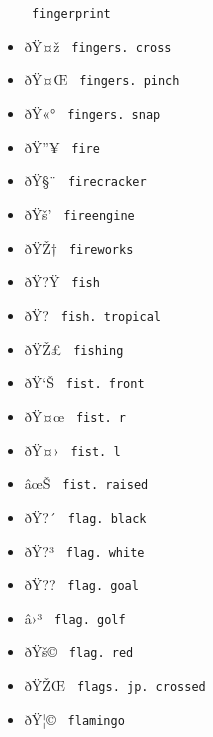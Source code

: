 \begin{itemize}
{  \texttt{\ fingerprint\ }}
\item
  \label{symbol-fingers.cross}{{ ðŸ¤ž }
  \texttt{\ fingers.\ cross\ }}
\item
  \label{symbol-fingers.pinch}{{ ðŸ¤Œ }
  \texttt{\ fingers.\ pinch\ }}
\item
  \label{symbol-fingers.snap}{{ ðŸ«° }
  \texttt{\ fingers.\ snap\ }}
\item
  \label{symbol-fire}{{ ðŸ''¥ } \texttt{\ fire\ }}
\item
  \label{symbol-firecracker}{{ ðŸ§¨ }
  \texttt{\ firecracker\ }}
\item
  \label{symbol-fireengine}{{ ðŸš' }
  \texttt{\ fireengine\ }}
\item
  \label{symbol-fireworks}{{ ðŸŽ† }
  \texttt{\ fireworks\ }}
\item
  \label{symbol-fish}{{ ðŸ?Ÿ } \texttt{\ fish\ }}
\item
  \label{symbol-fish.tropical}{{ ðŸ? }
  \texttt{\ fish.\ tropical\ }}
\item
  \label{symbol-fishing}{{ ðŸŽ£ } \texttt{\ fishing\ }}
\item
  \label{symbol-fist.front}{{ ðŸ`Š }
  \texttt{\ fist.\ front\ }}
\item
  \label{symbol-fist.r}{{ ðŸ¤œ } \texttt{\ fist.\ r\ }}
\item
  \label{symbol-fist.l}{{ ðŸ¤› } \texttt{\ fist.\ l\ }}
\item
  \label{symbol-fist.raised}{{ âœŠ }
  \texttt{\ fist.\ raised\ }}
\item
  \label{symbol-flag.black}{{ ðŸ?´ }
  \texttt{\ flag.\ black\ }}
\item
  \label{symbol-flag.white}{{ ðŸ?³ }
  \texttt{\ flag.\ white\ }}
\item
  \label{symbol-flag.goal}{{ ðŸ?? }
  \texttt{\ flag.\ goal\ }}
\item
  \label{symbol-flag.golf}{{ â›³ }
  \texttt{\ flag.\ golf\ }}
\item
  \label{symbol-flag.red}{{ ðŸš© }
  \texttt{\ flag.\ red\ }}
\item
  \label{symbol-flags.jp.crossed}{{ ðŸŽŒ }
  \texttt{\ flags.\ jp.\ crossed\ }}
\item
  \label{symbol-flamingo}{{ ðŸ¦© } \texttt{\ flamingo\ }}

\end{itemize}
